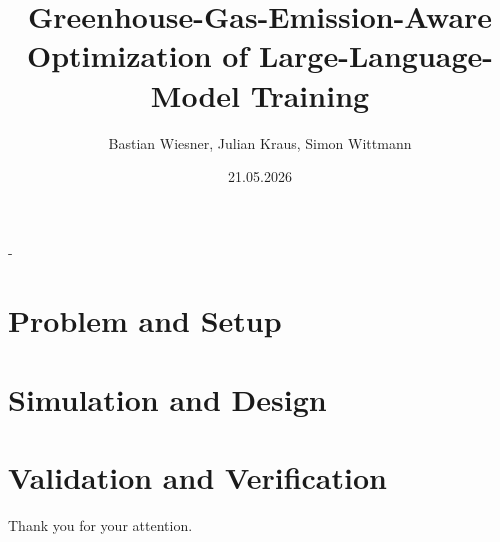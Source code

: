 \documentclass[final]{beamer}
\title[Emission-Aware LLM Training]{Greenhouse-Gas-Emission-Aware Optimization
  of
Large-Language-Model Training}
\author[TheGreenEpoch]{
  Bastian Wiesner, Julian Kraus, Simon Wittmann%
}
\institute[FAU]{%
  Friedrich-Alexander-Universität Erlangen-Nürnberg, Computer Science 7%
}
\date{21.05.2026}
\begin{document}
\begin{frame}[t,titleimagenofooter]{-}
  \titlepage%
\end{frame}

%

\section{Problem and Setup}









% 

\section{Simulation and Design}




\section{Validation and Verification}


%
%


\begin{frame}[titleimagenofooter]{}{}
  \centering
  Thank you for your attention.
\end{frame}


\end{document}
